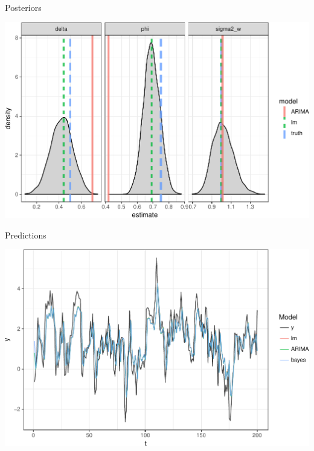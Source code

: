 \documentclass[11pt,ignorenonframetext,]{beamer}
\begin{document}
\begin{frame}{%
\protect\hypertarget{posteriors}{%
Posteriors}}

\begin{center}\includegraphics[width=\textwidth]{Lec10_files/figure-beamer/unnamed-chunk-8-1} \end{center}

\end{frame}

\begin{frame}{%
\protect\hypertarget{predictions}{%
Predictions}}

\begin{center}\includegraphics[width=\textwidth]{Lec10_files/figure-beamer/unnamed-chunk-9-1} \end{center}

\end{frame}
\end{document}
